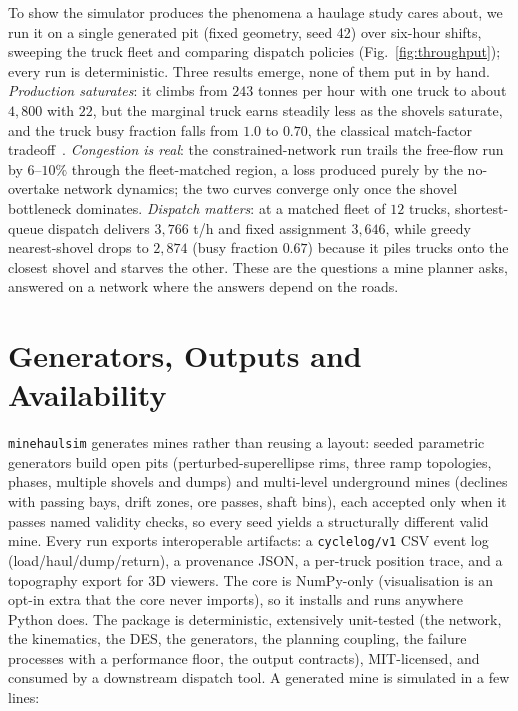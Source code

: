 \documentclass[journal]{IEEEtran}
\begin{document}
To show the simulator produces the phenomena a haulage study cares about, we run it on a single generated pit
(fixed geometry, seed 42) over six-hour shifts, sweeping the truck fleet and comparing dispatch policies
(Fig.~\ref{fig:throughput}); every run is deterministic. Three results emerge, none of them put in by hand.
\emph{Production saturates}: it climbs from $243$ tonnes per hour with one truck to about $4{,}800$ with $22$,
but the marginal truck earns steadily less as the shovels saturate, and the truck busy fraction falls from $1.0$
to $0.70$, the classical match-factor tradeoff~\cite{morgan}. \emph{Congestion is real}: the constrained-network run trails the
free-flow run by $6$--$10\%$ through the fleet-matched region, a loss produced purely by the no-overtake network
dynamics; the two curves converge only once the shovel bottleneck dominates. \emph{Dispatch matters}: at a
matched fleet of $12$ trucks, shortest-queue dispatch delivers $3{,}766$ t/h and fixed assignment $3{,}646$,
while greedy nearest-shovel drops to $2{,}874$ (busy fraction $0.67$) because it piles trucks onto the closest
shovel and starves the other. These are the questions a mine planner asks, answered on a network where the
answers depend on the roads.

\section{Generators, Outputs and Availability}\label{sec:arch}

\texttt{minehaulsim} generates mines rather than reusing a layout: seeded parametric generators build open pits
(perturbed-superellipse rims, three ramp topologies, phases, multiple shovels and dumps) and multi-level
underground mines (declines with passing bays, drift zones, ore passes, shaft bins), each accepted only when it
passes named validity checks, so every seed yields a structurally different valid mine. Every run exports interoperable artifacts: a
\texttt{cyclelog/v1} CSV event log (load/haul/dump/return), a provenance JSON, a per-truck position trace, and a
topography export for 3D viewers. The core is NumPy-only (visualisation is an opt-in extra that the core never
imports), so it installs and runs anywhere Python does. The package is deterministic, extensively unit-tested
(the network, the kinematics, the DES, the generators, the planning coupling, the failure processes with a
performance floor, the output contracts), MIT-licensed, and consumed by a downstream dispatch tool. A generated
mine is simulated in a few lines:
\end{document}
